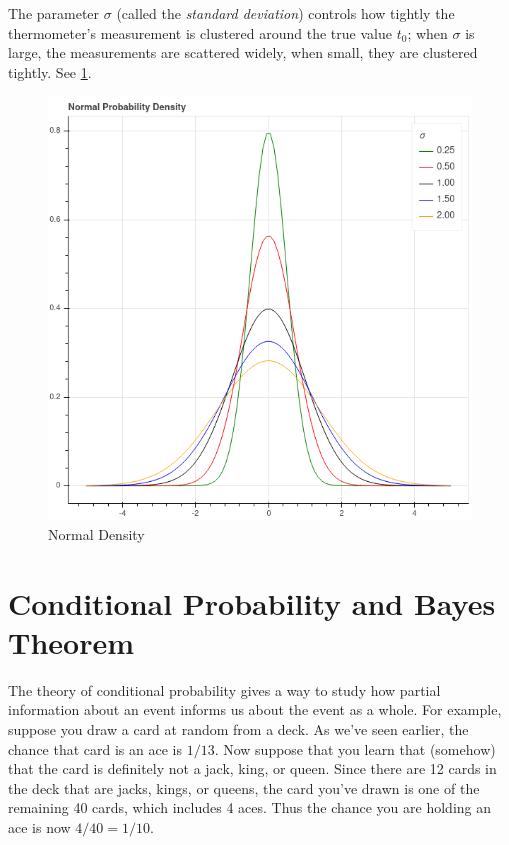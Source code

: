 \documentclass[
  oneside]{scrbook}
\begin{document}
The parameter \(\sigma\) (called the \emph{standard deviation}) controls
how tightly the thermometer's measurement is clustered around the true
value \(t_0\); when \(\sigma\) is large, the measurements are scattered
widely, when small, they are clustered tightly. See \cref{fig:density}.

\begin{figure}
\hypertarget{fig:density}{%
\centering
\includegraphics{img/density.png}
\caption{Normal Density}\label{fig:density}
}
\end{figure}

\hypertarget{conditional-probability-and-bayes-theorem}{%
\section{Conditional Probability and Bayes
Theorem}\label{conditional-probability-and-bayes-theorem}}

The theory of conditional probability gives a way to study how partial
information about an event informs us about the event as a whole. For
example, suppose you draw a card at random from a deck. As we've seen
earlier, the chance that card is an ace is \(1/13\). Now suppose that
you learn that (somehow) that the card is definitely not a jack, king,
or queen. Since there are 12 cards in the deck that are jacks, kings, or
queens, the card you've drawn is one of the remaining 40 cards, which
includes 4 aces. Thus the chance you are holding an ace is now
\(4/40=1/10\).
\end{document}

